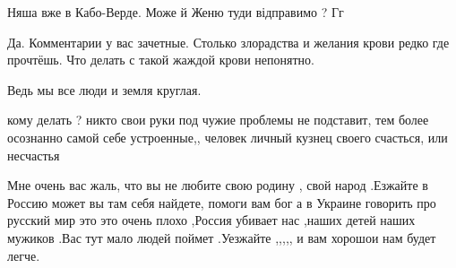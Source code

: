 \begin{itemize}
\begin{itemize}
 
Няша вже в Кабо-Верде.
Може й Женю туди відправимо ?
Гг

\end{itemize}

 

Да. Комментарии у вас зачетные. Столько злорадства и желания крови редко где
прочтёшь. Что делать с такой жаждой крови непонятно.

Ведь мы все люди и земля круглая.

\begin{itemize}
 
кому делать ? никто свои руки под чужие проблемы не подставит, тем более осознанно самой себе устроенные,, человек личный кузнец своего счасться, или несчастья
\end{itemize}

 

Мне очень вас жаль, что вы не любите свою родину , свой народ .Езжайте в Россию
может вы там себя найдете, помоги вам бог а в Украине говорить про русский мир
это это очень плохо ,Россия убивает нас ,наших детей наших мужиков .Вас тут
мало людей поймет .Уезжайте ,,,,, и вам хорошои нам будет легче.

\begin{itemize}
 

\end{itemize}
\end{itemize}
